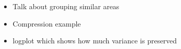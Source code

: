 \begin{itemize}
  \item Talk about grouping similar areas
  \item Compression example
  \item logplot which shows how much variance is preserved
\end{itemize}
